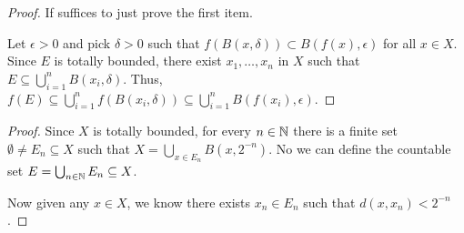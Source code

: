 \documentclass{report}
\begin{document}
\begin{proof}
    If suffices to just prove the first item. 

    Let $\epsilon  >  0$ and pick $\delta > 0$ such that $f(B(x, \delta)) \subset B(f(x), \epsilon)$ for all $x \in X$. Since $E$ is totally bounded, there exist $x_1, \ldots, x_n$ in $X$ such that $E \subseteq \bigcup_{i=1}^n B(x_i, \delta)$. Thus, $f(E) \subseteq \bigcup_{i=1}^n f(B(x_i, \delta)) \subseteq \bigcup_{i=1}^n B(f(x_i), \epsilon)$. 
\end{proof}

\begin{proof}
    Since $X$ is totally bounded, for every $n \in \NN$ there is a finite set $\emptyset \neq E_n \subseteq X$ such that $X = \bigcup_{x \in E_n} B(x, 2^{-n})$. No we can define the countable set $E = \bigcup_{n \in \NN} E_n \subseteq X$. 

    Now given any $x \in X$, we know there exists $x_n \in E_n$ such that $d(x, x_n) < 2^{-n}$. 
\end{proof}

\end{document}
